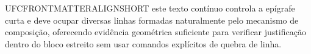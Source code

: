 UFCFRONTMATTERALIGNSHORT este texto contínuo controla a epígrafe curta e deve ocupar diversas linhas formadas naturalmente pelo mecanismo de composição, oferecendo evidência geométrica suficiente para verificar justificação dentro do bloco estreito sem usar comandos explícitos de quebra de linha.
